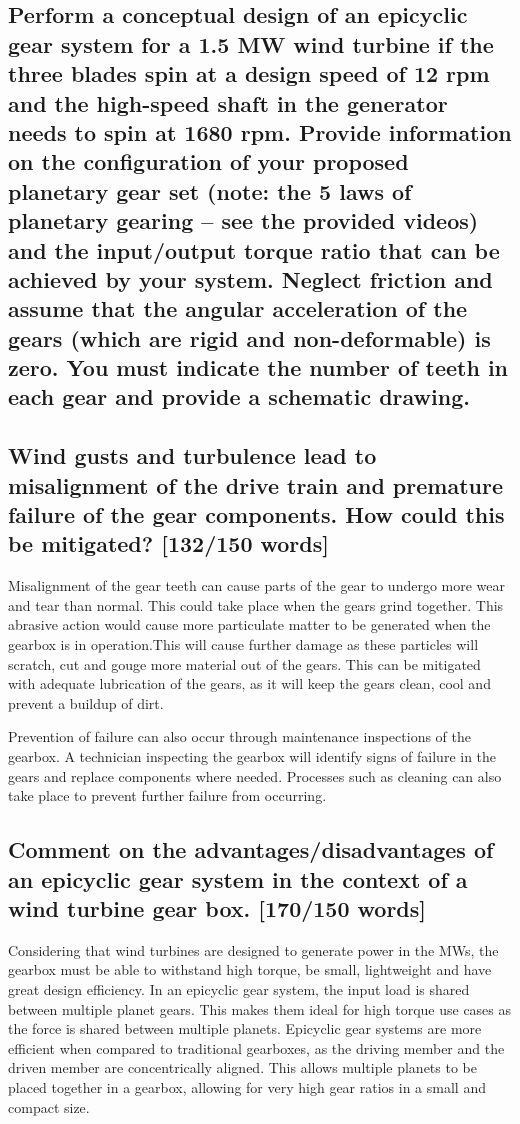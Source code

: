 \documentclass[12pt]{article}
\numberwithin{equation}{section}
\begin{document}
\begin{flushleft}
\subsection{Perform a conceptual design of an epicyclic gear system for a 1.5 MW wind turbine if the three blades spin at a design speed of 12 rpm and the high-speed shaft in the generator needs to spin at 1680 rpm. Provide information on the configuration of your proposed planetary gear set (note: the 5 laws of planetary gearing – see the provided videos) and the input/output torque ratio that can be achieved by your system. Neglect friction and assume that the angular acceleration of the gears (which are rigid and non-deformable) is zero. You must indicate the number of teeth in each gear and provide a schematic drawing.}
\subsection{Wind gusts and turbulence lead to misalignment of the drive train and premature failure of the gear components. How could this be mitigated? [132/150 words]}
Misalignment of the gear teeth can cause parts of the gear to undergo more wear and tear than normal. This could take place when the gears grind together. This abrasive action would cause more particulate matter to be generated when the gearbox is in operation.This will cause further damage as these particles will scratch, cut and gouge more material out of the gears. This can be mitigated with adequate lubrication of the gears, as it will keep the gears clean, cool and prevent a buildup of dirt. 

Prevention of failure can also occur through maintenance inspections of the gearbox. A technician inspecting the gearbox will identify signs of failure in the gears and replace components where needed. Processes such as cleaning can also take place to prevent further failure from occurring.

\subsection{Comment on the advantages/disadvantages of an epicyclic gear system in the context of a wind turbine gear box. [170/150 words]}
Considering that wind turbines are designed to generate power in the MWs, the gearbox must be able to withstand high torque, be small, lightweight and have great design efficiency. In an epicyclic gear system, the input load is shared between multiple planet gears. This makes them ideal for high torque use cases as the force is shared between multiple planets. Epicyclic gear systems are more efficient when compared to traditional gearboxes, as the driving member and the driven member are concentrically aligned. This allows multiple planets to be placed together in a gearbox, allowing for very high gear ratios in a small and compact size.


\end{flushleft}
\end{document}

